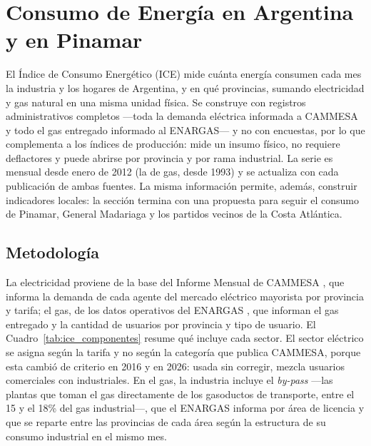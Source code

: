 
\section{Consumo de Energía en Argentina y en Pinamar}

El Índice de Consumo Energético (ICE) mide cuánta energía consumen cada mes la industria y los hogares de Argentina, y en qué provincias, sumando electricidad y gas natural en una misma unidad física. Se construye con registros administrativos completos ---toda la demanda eléctrica informada a CAMMESA y todo el gas entregado informado al ENARGAS--- y no con encuestas, por lo que complementa a los índices de producción: mide un insumo físico, no requiere deflactores y puede abrirse por provincia y por rama industrial. La serie es mensual desde enero de 2012 (la de gas, desde 1993) y se actualiza con cada publicación de ambas fuentes. La misma información permite, además, construir indicadores locales: la sección termina con una propuesta para seguir el consumo de Pinamar, General Madariaga y los partidos vecinos de la Costa Atlántica.

\subsection{Metodología}

La electricidad proviene de la base del Informe Mensual de CAMMESA \cite{cammesa}, que informa la demanda de cada agente del mercado eléctrico mayorista por provincia y tarifa; el gas, de los datos operativos del ENARGAS \cite{enargas}, que informan el gas entregado y la cantidad de usuarios por provincia y tipo de usuario. El Cuadro~\ref{tab:ice_componentes} resume qué incluye cada sector. El sector eléctrico se asigna según la tarifa y no según la categoría que publica CAMMESA, porque esta cambió de criterio en 2016 y en 2026: usada sin corregir, mezcla usuarios comerciales con industriales. En el gas, la industria incluye el \emph{by-pass} ---las plantas que toman el gas directamente de los gasoductos de transporte, entre el 15 y el 18\% del gas industrial---, que el ENARGAS informa por área de licencia y que se reparte entre las provincias de cada área según la estructura de su consumo industrial en el mismo mes.

